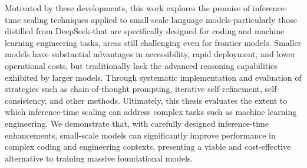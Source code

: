 Motivated by these developments, this work explores the promise of inference-time scaling techniques applied to small-scale language models-particularly those distilled from DeepSeek-that are specifically designed for coding and machine learning engineering tasks, areas still challenging even for frontier models. Smaller models have substantial advantages in accessibility, rapid deployment, and lower operational costs, but traditionally lack the advanced reasoning capabilities exhibited by larger models. Through systematic implementation and evaluation of strategies such as chain-of-thought prompting, iterative self-refinement, self-consistency, and other methods. Ultimately, this thesis evaluates the extent to which inference-time scaling can address complex tasks such as machine learning engineering. We demonstrate that, with carefully designed inference-time enhancements, small-scale models can significantly improve performance in complex coding and engineering contexts, presenting a viable and cost-effective alternative to training massive foundational models.

